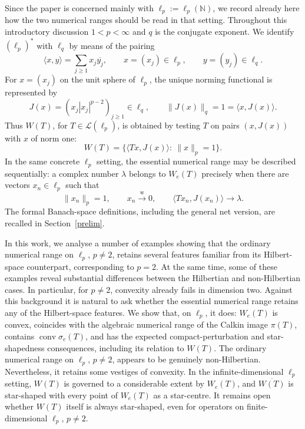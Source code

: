 \documentclass[11pt]{amsart}
\numberwithin{equation}{section}
\theoremstyle{definition}
\theoremstyle{remark}
\newcommand{\ip}[2]{\langle #1,#2\rangle}
\newcommand{\wto}{\xrightarrow{\mathrm w}}
\begin{document}
Since the paper is concerned mainly with $\ell_p:=\ell_p(\mathbb N)$, we record already here how the two numerical ranges should be read in that setting. Throughout this introductory discussion $1<p<\infty$ and $q$ is the conjugate exponent. We identify $(\ell_p)^*$ with $\ell_q$ by means of the pairing
\[
        \ip{x}{y}
        =\sum_{j\ge1}x_j\overline{y_j}, \qquad 
        x=(x_j) \in\ell_p,\qquad y=(y_j)\in\ell_q .
\]
For $x=(x_j)$ on the unit sphere of $\ell_p$, the unique norming functional is represented by
\[
        J(x)=(x_j|x_j|^{p-2})_{j\ge1}\in\ell_q,
        \qquad
        \|J(x)\|_q=1=\ip{x}{J(x)}.
\]
Thus $W(T)$, for $T\in\mathcal L(\ell_p)$, is obtained by testing $T$ on pairs $(x,J(x))$ with $x$ of norm one:
\[
        W(T)=\bigl\{\ip{Tx}{J(x)}:\ \|x\|_p=1\bigr\}.
\]
In the same concrete $\ell_p$ setting, the essential numerical range may be described sequentially: a complex number $\lambda$ belongs to $W_e(T)$ precisely when there are vectors $x_n\in\ell_p$ such that
\[
        \|x_n\|_p=1,
        \qquad x_n\wto0,
        \qquad \ip{Tx_n}{J(x_n)}\to\lambda .
\]
The formal Banach-space definitions, including the general net version, are recalled in Section~\ref{prelim}.


In this work, we analyse a number of examples showing that the ordinary numerical range on \(\ell_p\), \(p\neq 2\), retains several features familiar from its Hilbert-space counterpart, corresponding to \(p=2\). At the same time, some of these examples reveal substantial differences between the Hilbertian and non-Hilbertian cases. In particular, for \(p\neq 2\), convexity already fails in dimension two.
 Against this background it is natural to ask whether the essential
numerical range retains any of the Hilbert-space features. We show that, on
\(\ell_p\), it does: \(W_e(T)\) is convex, coincides with the algebraic numerical
range of the Calkin image \(\pi(T)\), contains \(\operatorname{conv}\sigma_e(T)\),
and has the expected compact-perturbation and star-shapedness consequences,
including its relation to $W(T).$
The ordinary numerical range on \(\ell_p\), \(p\ne2\), appears to be genuinely non-Hilbertian. Nevertheless, it retains some vestiges of convexity. In the infinite-dimensional \(\ell_p\) setting, \(W(T)\) is governed to a considerable extent by \(W_e(T)\), and \(\overline{W(T)}\) is star-shaped with every point of \(W_e(T)\) as a star-centre. It remains open whether \(W(T)\) itself is always star-shaped, even for operators on finite-dimensional \(\ell_p\), \(p\ne 2\).
\end{document}
